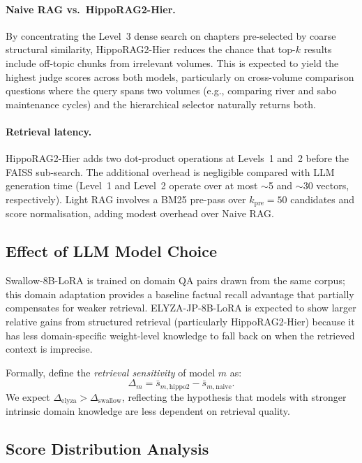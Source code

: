 \documentclass[twocolumn]{article}
\begin{document}
\paragraph{Naive RAG vs.\ HippoRAG2-Hier.}
By concentrating the Level~3 dense search on chapters pre-selected by coarse
structural similarity, HippoRAG2-Hier reduces the chance that top-$k$ results
include off-topic chunks from irrelevant volumes.
This is expected to yield the highest judge scores across both models, particularly
on cross-volume comparison questions where the query spans two volumes
(e.g., comparing river and sabo maintenance cycles) and the hierarchical selector
naturally returns both.

\paragraph{Retrieval latency.}
HippoRAG2-Hier adds two dot-product operations at Levels~1 and~2 before the
FAISS sub-search.
The additional overhead is negligible compared with LLM generation time
(Level~1 and Level~2 operate over at most $\sim$5 and $\sim$30 vectors, respectively).
Light RAG involves a BM25 pre-pass over $k_{\mathrm{pre}}=50$ candidates
and score normalisation, adding modest overhead over Naive RAG.

\subsection{Effect of LLM Model Choice}

Swallow-8B-LoRA is trained on domain QA pairs drawn from the same corpus;
this domain adaptation provides a baseline factual recall advantage
that partially compensates for weaker retrieval.
ELYZA-JP-8B-LoRA is expected to show larger relative gains from structured retrieval
(particularly HippoRAG2-Hier) because it has less domain-specific weight-level
knowledge to fall back on when the retrieved context is imprecise.

Formally, define the \emph{retrieval sensitivity} of model $m$ as:
\begin{equation}
  \Delta_m
  = \bar{s}_{m,\mathrm{hippo2}} - \bar{s}_{m,\mathrm{naive}}.
  \label{eq:sensitivity}
\end{equation}
We expect $\Delta_{\mathrm{elyza}} > \Delta_{\mathrm{swallow}}$,
reflecting the hypothesis that models with stronger intrinsic domain knowledge
are less dependent on retrieval quality.

\subsection{Score Distribution Analysis}
\end{document}
